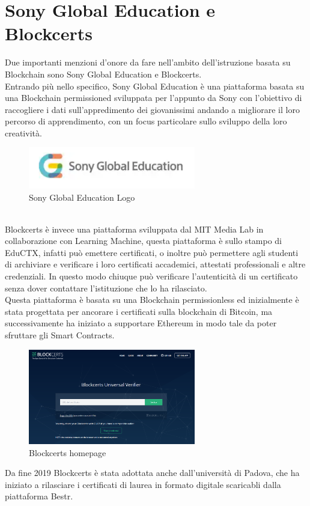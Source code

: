 \section{Sony Global Education e Blockcerts}
Due importanti menzioni d'onore da fare nell'ambito dell'istruzione basata su Blockchain sono Sony Global Education e Blockcerts.
\\Entrando più nello specifico, Sony Global Education è una piattaforma basata su una Blockchain permissioned sviluppata per l'appunto da Sony con l'obiettivo di raccogliere i dati 
sull'appredimento dei giovanissimi andando a migliorare il loro percorso di apprendimento, con un focus particolare sullo sviluppo della loro creatività.
\begin{figure}[h]
    \centering
    \includegraphics[width=0.65\textwidth]{Immagini/Sony_Global_Education_logo.PNG}
    \caption{Sony Global Education Logo}
\end{figure}
\\Blockcerts è invece una piattaforma sviluppata dal MIT Media Lab in collaborazione con Learning Machine, questa piattaforma è sullo stampo di EduCTX,
infatti può emettere certificati, o inoltre può permettere agli studenti di archiviare e verificare i loro certificati accademici, attestati professionali e altre credenziali.
In questo modo chiuque può verificare l'autenticità di un certificato senza dover contattare l'istituzione che lo ha rilasciato.
\\Questa piattaforma è basata su una Blockchain permissionless ed inizialmente è stata progettata per ancorare i certificati sulla blockchain di Bitcoin, 
ma successivamente ha iniziato a supportare Ethereum in modo tale da poter sfruttare gli Smart Contracts.
\newpage
\begin{figure}[h]
    \centering
    \includegraphics[width=0.65\textwidth]{Immagini/Blockcerts_homepage.PNG}
    \caption{Blockcerts homepage}
\end{figure}
Da fine 2019 Blockcerts è stata adottata anche dall'università di Padova, che ha iniziato a rilasciare i certificati di laurea in formato digitale scaricabli dalla piattaforma Bestr.
